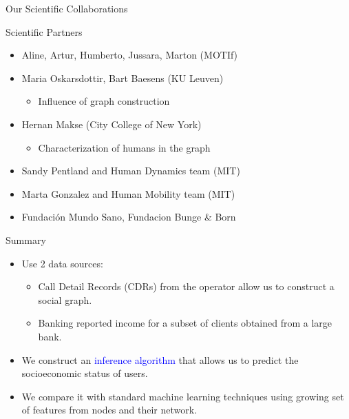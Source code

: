 \documentclass[usenames,dvipsnames]{beamer}
\begin{document}
\begin{frame}{Our Scientific Collaborations}
\begin{block}{Scientific Partners}
\begin{itemize}
\item Aline, Artur, Humberto, Jussara, Marton (MOTIf)
\medskip
\item Maria Oskarsdottir, Bart Baesens (KU Leuven)
\begin{itemize}
\item Influence of graph construction
\end{itemize}
\medskip
\item Hernan Makse (City College of New York) 
\begin{itemize}
\item Characterization of humans in the graph
\end{itemize}
\medskip
\item Sandy Pentland and Human Dynamics team (MIT)
\item Marta Gonzalez and Human Mobility team (MIT)
\item Fundación Mundo Sano, Fundacion Bunge \& Born
\end{itemize}
\end{block}


{\tiny 
\nocite{leo2015socioeconomic}
\nocite{sarraute2015city}
\nocite{sarraute2014}
}
\end{frame}


\begin{frame}{Summary}

\begin{itemize}

\begin{block}{Objective}
Compare methods for the \textbf{inference of socioeconomic status} in the communication graph.
\end{block}
\medskip

\pause

\item Use 2 data sources:
\begin{itemize}
\item Call Detail Records (CDRs) from the operator allow us to construct a social graph.
\item Banking reported income for a subset of clients obtained from a large bank.
\end{itemize} 

\item We construct an \textcolor{blue}{inference algorithm} that allows us to predict the socioeconomic status of users.

\item We compare it with standard machine learning techniques using growing set of features from nodes and their network.

\end{itemize}

\end{frame}
\end{document}
